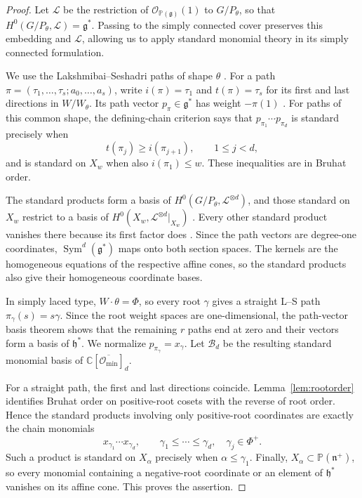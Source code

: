 \documentclass[12pt]{article}
\theoremstyle{definition}
\DeclareMathOperator{\Sym}{Sym}
\newcommand{\C}{\mathbb C}
\newcommand{\g}{\mathfrak g}
\newcommand{\h}{\mathfrak h}
\newcommand{\n}{\mathfrak n^{+}}
\newcommand{\oc}{\overline{\mathcal O_{\min}}}
\newcommand{\PP}{\mathbb P}
\begin{document}
\begin{proof}
    Let $\mathcal L$ be the restriction of $\mathcal O_{\PP(\g)}(1)$ to $G/P_\theta$, so that $H^0(G/P_\theta,\mathcal L)=\g^*$. Passing to the simply connected cover preserves this embedding and $\mathcal L$, allowing us to apply standard monomial theory in its simply connected formulation.

    We use the Lakshmibai--Seshadri paths of shape $\theta$ \cite[\S2]{Lit94}. For a path $\pi=(\tau_1,\ldots,\tau_s;a_0,\ldots,a_s)$, write $i(\pi)=\tau_1$ and $t(\pi)=\tau_s$ for its first and last directions in $W/W_\theta$. Its path vector $p_\pi\in\g^*$ has weight $-\pi(1)$ \cite[Theorem~3]{Lit98}. For paths of this common shape, the defining-chain criterion \cite[\S11, Corollary~3 and Theorem~8]{Lit96} says that $p_{\pi_1}\cdots p_{\pi_d}$ is standard precisely when
    $$
        t(\pi_j)\geq i(\pi_{j+1}),\qquad 1\leq j<d,
    $$
    and is standard on $X_w$ when also $i(\pi_1)\leq w$. These inequalities are in Bruhat order.

    The standard products form a basis of $H^0(G/P_\theta,\mathcal L^{\otimes d})$, and those standard on $X_w$ restrict to a basis of $H^0(X_w,\mathcal L^{\otimes d}|_{X_w})$ \cite[Theorems~4 and~7(ii)]{Lit98}. Every other standard product vanishes there because its first factor does \cite[Theorem~6]{Lit98}. Since the path vectors are degree-one coordinates, $\Sym^d(\g^*)$ maps onto both section spaces. The kernels are the homogeneous equations of the respective affine cones, so the standard products also give their homogeneous coordinate bases.

    In simply laced type, $W\cdot\theta=\Phi$, so every root $\gamma$ gives a straight L--S path $\pi_\gamma(s)=s\gamma$. Since the root weight spaces are one-dimensional, the path-vector basis theorem \cite[Theorem~3]{Lit98} shows that the remaining $r$ paths end at zero and their vectors form a basis of $\h^*$. We normalize $p_{\pi_\gamma}=x_\gamma$. Let $\mathcal B_d$ be the resulting standard monomial basis of $\C[\oc]_d$.

    For a straight path, the first and last directions coincide. Lemma~\ref{lem:rootorder} identifies Bruhat order on positive-root cosets with the reverse of root order. Hence the standard products involving only positive-root coordinates are exactly the chain monomials
    \begin{equation}\label{eq:chains}
        x_{\gamma_1}\cdots x_{\gamma_d},\qquad
        \gamma_1\leq\cdots\leq\gamma_d,\quad \gamma_j\in\Phi^+.
    \end{equation}
    Such a product is standard on $X_\alpha$ precisely when $\alpha\leq\gamma_1$. Finally, $X_\alpha\subset\PP(\n)$, so every monomial containing a negative-root coordinate or an element of $\h^*$ vanishes on its affine cone. This proves the assertion.
\end{proof}
\end{document}
